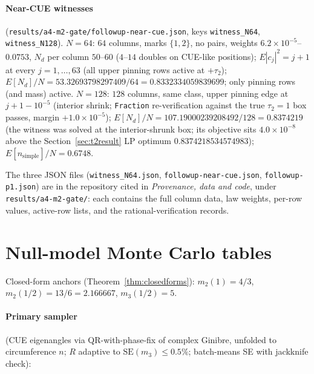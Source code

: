 \documentclass[11pt]{article}
\theoremstyle{plain}
\theoremstyle{definition}
\theoremstyle{remark}
\newcommand{\Nd}{N_{d}}
\begin{document}
\paragraph{Near-CUE witnesses}
(\texttt{results/a4-m2-gate/}\allowbreak\texttt{followup-near-cue.json}, keys
\texttt{witness\_N64}, \texttt{witness\_N128}). $N = 64$: $64$ columns, marks
$\{1, 2\}$, no pairs, weights $6.2 \times 10^{-5}$--$0.0753$, $\Nd$ per column
$50$--$60$ ($4$--$14$ doubles on CUE-like positions); $E|c_j|^2 = j + 1$ at every
$j = 1, \ldots, 63$ (all upper pinning rows active at $+\tau_2$);
$E[\Nd]/N = 53.32693798297409/64 = 0.8332334059839699$; only pinning rows (and
mass) active. $N = 128$: $128$ columns, same class, upper pinning edge at
$j + 1 - 10^{-5}$ (interior shrink; \texttt{Fraction} re-verification against the
true $\tau_2 = 1$ box passes, margin $+1.0 \times 10^{-5}$);
$E[\Nd]/N = 107.19000239208492/128 = 0.8374219$ (the witness was solved at the
interior-shrunk box; its objective sits $4.0 \times 10^{-8}$ above the
Section~\ref{sec:t2result} LP optimum $0.8374218534574983$);
$E[n_{\mathrm{simple}}]/N = 0.6748$.

The three JSON files (\texttt{witness\_N64.json},
\texttt{followup-near-cue.json}, \texttt{followup-p1.json}) are in the repository
cited in \emph{Provenance, data and code}, under
\texttt{results/a4-m2-gate/}: each contains the full column data, law weights,
per-row values, active-row lists, and the rational-verification records.

\section{Null-model Monte Carlo tables}
\label{app:mc}

Closed-form anchors (Theorem~\ref{thm:closedforms}): $m_2(1) = 4/3$,
$m_2(1/2) = 13/6 = 2.166667$, $m_3(1/2) = 5$.

\paragraph{Primary sampler}
(CUE eigenangles via QR-with-phase-fix of complex Ginibre, unfolded to
circumference $n$; $R$ adaptive to $\mathrm{SE}(m_3) \le 0.5\%$; batch-means SE
with jackknife check):
\end{document}
